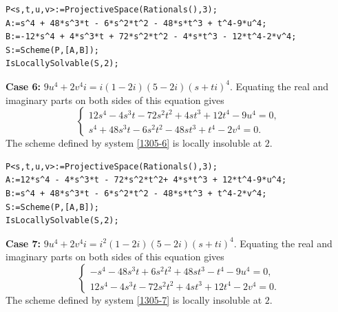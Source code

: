 \documentclass[a4paper,12pt,english,reqno]{amsart}
\begin{document}
\begin{lstlisting}
P<s,t,u,v>:=ProjectiveSpace(Rationals(),3);
A:=s^4 + 48*s^3*t - 6*s^2*t^2 - 48*s*t^3 + t^4-9*u^4;
B:=-12*s^4 + 4*s^3*t + 72*s^2*t^2 - 4*s*t^3 - 12*t^4-2*v^4;
S:=Scheme(P,[A,B]);
IsLocallySolvable(S,2);
\end{lstlisting}
{\bf Case 6:} $9u^4+2v^4i=i(1-2i)(5-2i)(s+ti)^4$. Equating the real and imaginary parts on both sides of this equation gives
\begin{equation}\label{1305-6}
\begin{cases}
12s^4 - 4s^3t - 72s^2t^2 + 4st^3 + 12t^4 - 9u^4=0,\\
s^4 + 48s^3t - 6s^2t^2 - 48st^3 + t^4 - 2v^4=0.
\end{cases}
\end{equation}
The scheme defined by system \eqref{1305-6} is locally insoluble at $2$.


\begin{lstlisting}
P<s,t,u,v>:=ProjectiveSpace(Rationals(),3);
A:=12*s^4 - 4*s^3*t - 72*s^2*t^2+ 4*s*t^3 + 12*t^4-9*u^4;
B:=s^4 + 48*s^3*t - 6*s^2*t^2 - 48*s*t^3 + t^4-2*v^4;
S:=Scheme(P,[A,B]);
IsLocallySolvable(S,2);
\end{lstlisting}
{\bf Case 7:} $9u^4+2v^4i=i^2(1-2i)(5-2i)(s+ti)^4$. Equating the real and imaginary parts on both sides of this equation gives
\begin{equation}\label{1305-7}
\begin{cases}
-s^4 - 48s^3t + 6s^2t^2 + 48st^3 - t^4 - 9u^4=0,\\
12s^4 - 4s^3t - 72s^2t^2 + 4st^3 + 12t^4 - 2v^4=0.
\end{cases}
\end{equation}
The scheme defined by system \eqref{1305-7} is locally insoluble at $2$.

\end{document}

